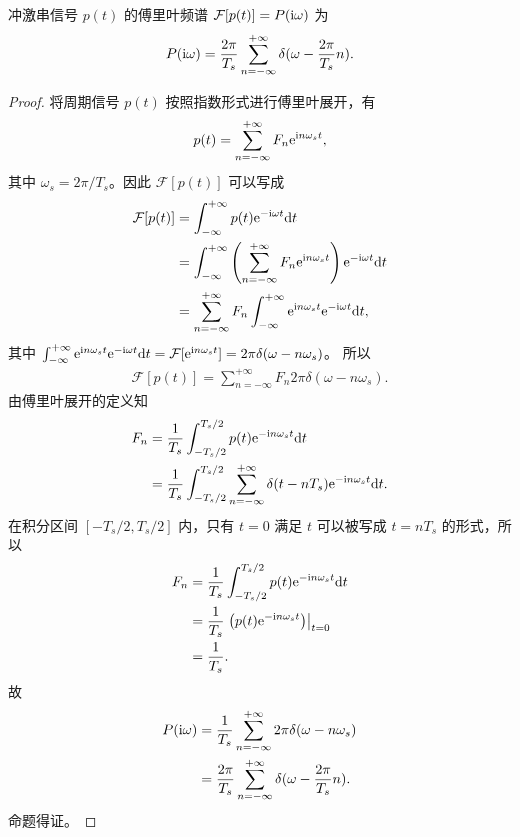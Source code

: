 \begin{property}
    冲激串信号 $p(t)$ 的傅里叶频谱 $\mathcal{F}[p(t)] = P(\mathrm{i} \omega)$ 为
    \begin{align*}
        P(\mathrm{i} \omega) = \frac{2\pi}{T_s}\sum_{n = -\infty}^{+\infty}\delta(\omega - \frac{2\pi}{T_s}n).
    \end{align*}
    \label{property:impulse-sampling-frequency-1}
\end{property}

\begin{proof}
    将周期信号 $p(t)$ 按照指数形式进行傅里叶展开，有
    \begin{align*}
        p(t) = \sum_{n = -\infty}^{+\infty}F_n\mathrm{e}^{\mathrm{i} n\omega_s t},
    \end{align*}
    其中 $\omega_s = 2\pi/T_s$。因此 $\mathcal{F}[p(t)]$ 可以写成
    \begin{align*}
        \mathcal{F}[p(t)] & = \int_{-\infty}^{+\infty}p(t)\mathrm{e}^{-\mathrm{i}\omega t}\mathrm{d}t \\
        & = \int_{-\infty}^{+\infty}\left(\sum_{n = -\infty}^{+\infty}F_n\mathrm{e}^{\mathrm{i} n\omega_s t}\right)\mathrm{e}^{-\mathrm{i}\omega t}\mathrm{d}t \\
        & = \sum_{n = -\infty}^{+\infty}F_n\int_{-\infty}^{+\infty}\mathrm{e}^{\mathrm{i} n\omega_s t}\mathrm{e}^{-\mathrm{i}\omega t}\mathrm{d}t,
    \end{align*}
    其中 $\int_{-\infty}^{+\infty}\mathrm{e}^{\mathrm{i} n\omega_s t}\mathrm{e}^{-\mathrm{i}\omega t}\mathrm{d}t
        = \mathcal{F}[\mathrm{e}^{\mathrm{i} n\omega_s t}] = 2\pi\delta(\omega - n\omega_s)$。
    所以
    \begin{align*}
        \mathcal{F}[p(t)] = \sum_{n = -\infty}^{+\infty}F_n2\pi\delta(\omega - n\omega_s).
    \end{align*}
    由傅里叶展开的定义知
    \begin{align*}
        F_n & = \frac{1}{T_s}\int_{-T_s/2}^{T_s/2}p(t)\mathrm{e}^{-\mathrm{i} n\omega_s t}\mathrm{d}t \\
        & = \frac{1}{T_s}\int_{-T_s/2}^{T_s/2}\sum_{n = -\infty}^{+\infty}\delta(t - nT_s)\mathrm{e}^{-\mathrm{i} n\omega_s t}\mathrm{d}t.
    \end{align*}
    在积分区间 $[-T_s/2, T_s/2]$ 内，只有 $t = 0$ 满足 $t$ 可以被写成 $t = nT_s$ 的形式，所以
    \begin{align*}
        F_n & = \frac{1}{T_s}\int_{-T_s/2}^{T_s/2}p(t)\mathrm{e}^{-\mathrm{i} n\omega_s t}\mathrm{d}t \\
        & = \frac{1}{T_s}\left.\left(p(t)\mathrm{e}^{-\mathrm{i} n\omega_s t}\right)\right|_{t = 0} \\
        & = \frac{1}{T_s}.
    \end{align*}
    故
    \begin{align*}
        P(\mathrm{i} \omega) & = \frac{1}{T_s}\sum_{n = -\infty}^{+\infty}2\pi\delta(\omega - n\omega_s) \\
        & = \frac{2\pi}{T_s}\sum_{n = -\infty}^{+\infty}\delta(\omega - \frac{2\pi}{T_s}n).
    \end{align*}
    命题得证。
\end{proof}

